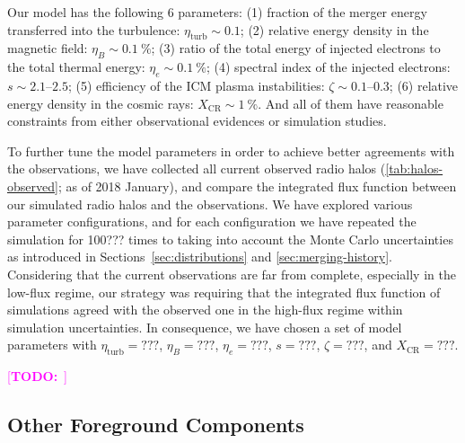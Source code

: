 \documentclass[modern]{aastex62}
\newcommand{\R}[1]{\mathrm{#1}}
\newcommand{\TODO}[1]{\textcolor{magenta}{[\textbf{TODO:}~\uuline{#1}]}}
\begin{document}
Our model has the following 6 parameters:
(1) fraction of the merger energy transferred into the turbulence:
$\eta_{\R{turb}} \sim 0.1$;
(2) relative energy density in the magnetic field:
$\eta_B \sim \SI{0.1}{\percent}$;
(3) ratio of the total energy of injected electrons to the total thermal
energy: $\eta_e \sim \SI{0.1}{\percent}$;
(4) spectral index of the injected electrons: $s \sim \numrange{2.1}{2.5}$;
(5) efficiency of the ICM plasma instabilities:
$\zeta \sim \numrange{0.1}{0.3}$;
(6) relative energy density in the cosmic rays:
$X_{\R{CR}} \sim \SI{1}{\percent}$.
And all of them have reasonable constraints from either observational
evidences or simulation studies.

To further tune the model parameters in order to achieve better agreements
with the observations, we have collected all current observed radio halos
(\autoref{tab:halos-observed}; as of 2018 January), and compare the integrated
flux function between our simulated radio halos and the observations.
We have explored various parameter configurations,
and for each configuration we have repeated the simulation for 100??? times
to taking into account the Monte Carlo uncertainties as introduced in
Sections~\ref{sec:distributions} and \ref{sec:merging-history}.
Considering that the current observations are far from complete,
especially in the low-flux regime, our strategy was requiring that the
integrated flux function of simulations agreed with the observed one
in the high-flux regime within simulation uncertainties.
In consequence, we have chosen a set of model parameters with
$\eta_{\R{turb}} = ???$, $\eta_B = ???$, $\eta_e = ???$, $s = ???$,
$\zeta = ???$, and $X_{\R{CR}} = ???$.

\TODO{figures ...}

\subsection{Other Foreground Components}
\label{sec:fg-other}
\end{document}
